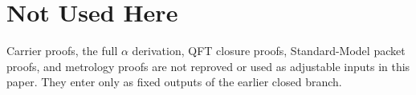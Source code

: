 \documentclass[11pt,a4paper]{article}
\begin{document}
\section{Not Used Here}

Carrier proofs, the full $\alpha$ derivation, QFT closure proofs, Standard-Model packet proofs,
and metrology proofs are not reproved or used as adjustable inputs in this paper. They enter only
as fixed outputs of the earlier closed branch.

\clearpage

\end{document}

